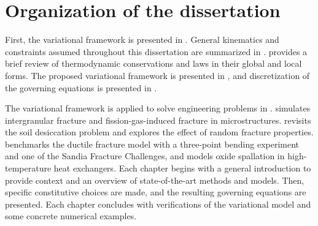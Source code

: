 \section{Organization of the dissertation}

First, the variational framework is presented in . General kinematics and constraints assumed throughout this dissertation are summarized in .  provides a brief review of thermodynamic conservations and laws in their global and local forms.
The proposed variational framework is presented in , and discretization of the governing equations is presented in .

The variational framework is applied to solve engineering problems in .  simulates intergranular fracture and fission-gas-induced fracture in microstructures.  revisits the soil desiccation problem and explores the effect of random fracture properties.  benchmarks the ductile fracture model with a three-point bending experiment and one of the Sandia Fracture Challenges, and models oxide spallation in high-temperature heat exchangers. Each chapter begins with a general introduction to provide context and an overview of state-of-the-art methods and models. Then, specific constitutive choices are made, and the resulting governing equations are presented. Each chapter concludes with verifications of the variational model and some concrete numerical examples.
